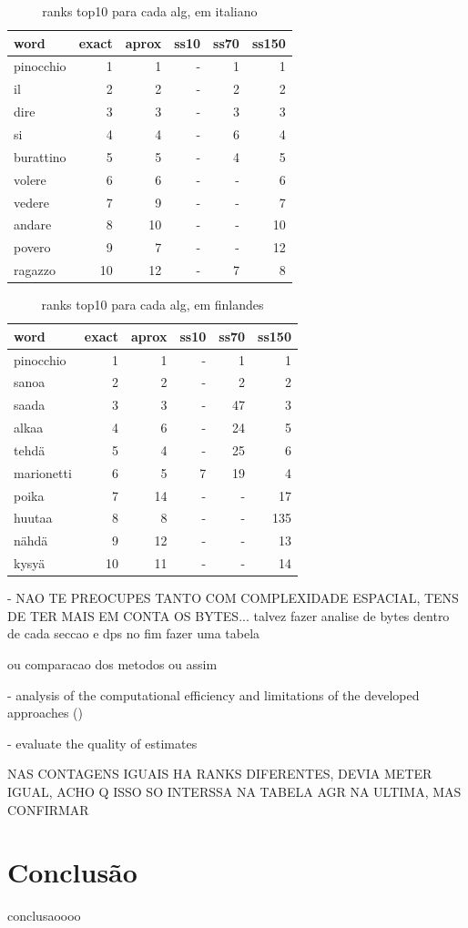 \documentclass[mirror, portugues]{revdetua}
\begin{document}
\begin{table}[H]
\centering
\caption{ranks top10 para cada alg, em italiano}
\label{table:rank10_it}
\begin{tabular}{lrrrrr}
\toprule
word & exact & aprox & ss10 & ss70 & ss150 \\
\midrule
pinocchio & 1 & 1 & - & 1 & 1 \\
il & 2 & 2 & - & 2 & 2 \\
dire & 3 & 3 & - & 3 & 3 \\
si & 4 & 4 & - & 6 & 4 \\
burattino & 5 & 5 & - & 4 & 5 \\
volere & 6 & 6 & - & - & 6 \\
vedere & 7 & 9 & - & - & 7 \\
andare & 8 & 10 & - & - & 10 \\
povero & 9 & 7 & - & - & 12 \\
ragazzo & 10 & 12 & - & 7 & 8 \\
\bottomrule
\end{tabular}
\end{table}


\begin{table}[H]
\centering
\caption{ranks top10 para cada alg, em finlandes}
\label{table:rank10_fi}
\begin{tabular}{lrrrrr}
\toprule
word & exact & aprox & ss10 & ss70 & ss150 \\
\midrule
pinocchio & 1 & 1 & - & 1 & 1 \\
sanoa & 2 & 2 & - & 2 & 2 \\
saada & 3 & 3 & - & 47 & 3 \\
alkaa & 4 & 6 & - & 24 & 5 \\
tehdä & 5 & 4 & - & 25 & 6 \\
marionetti & 6 & 5 & 7 & 19 & 4 \\
poika & 7 & 14 & - & - & 17 \\
huutaa & 8 & 8 & - & - & 135 \\
nähdä & 9 & 12 & - & - & 13 \\
kysyä & 10 & 11 & - & - & 14 \\
\bottomrule
\end{tabular}
\end{table}


- NAO TE PREOCUPES TANTO COM COMPLEXIDADE ESPACIAL, TENS DE TER MAIS EM CONTA OS BYTES... talvez fazer analise de bytes dentro de cada seccao e dps no fim fazer uma tabela 

ou comparacao dos metodos ou assim

- analysis of the computational efficiency and limitations of the developed approaches ()

    - evaluate the quality of estimates

NAS CONTAGENS IGUAIS HA RANKS DIFERENTES, DEVIA METER IGUAL, ACHO Q ISSO SO INTERSSA NA TABELA AGR NA ULTIMA, MAS CONFIRMAR


\section{Conclusão}

conclusaoooo


\end{document}
